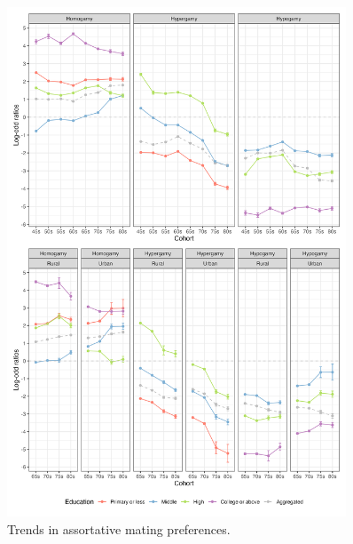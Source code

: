 \begin{figure}[H]
    \centering
    \includegraphics[width=0.9\textwidth]{chapters/chapter4/figures/odds_ratio.png}
    \caption{Trends in assortative mating preferences.}
    \label{fig:odds_ratio}
\end{figure}


